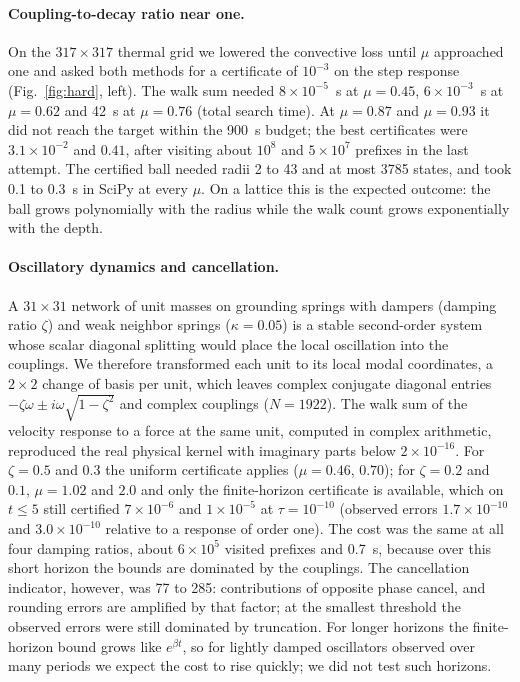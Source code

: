 \documentclass[aps,pra,superscriptaddress,floatfix,longbibliography,twocolumn]{revtex4-2}
\begin{document}
\paragraph*{Coupling-to-decay ratio near one.} On the $317\times317$ thermal grid we lowered the convective loss until $\mu$ approached one and asked both methods for a certificate of $10^{-3}$ on the step response (Fig.~\ref{fig:hard}, left). The walk sum needed $8\times10^{-5}$~s at $\mu=0.45$, $6\times10^{-3}$~s at $\mu=0.62$ and 42~s at $\mu=0.76$ (total search time). At $\mu=0.87$ and $\mu=0.93$ it did not reach the target within the 900~s budget; the best certificates were $3.1\times10^{-2}$ and $0.41$, after visiting about $10^8$ and $5\times10^7$ prefixes in the last attempt. The certified ball needed radii 2 to 43 and at most 3785 states, and took 0.1 to 0.3~s in SciPy at every $\mu$. On a lattice this is the expected outcome: the ball grows polynomially with the radius while the walk count grows exponentially with the depth.

\paragraph*{Oscillatory dynamics and cancellation.} A $31\times31$ network of unit masses on grounding springs with dampers (damping ratio $\zeta$) and weak neighbor springs ($\kappa=0.05$) is a stable second-order system whose scalar diagonal splitting would place the local oscillation into the couplings. We therefore transformed each unit to its local modal coordinates, a $2\times2$ change of basis per unit, which leaves complex conjugate diagonal entries $-\zeta\omega\pm i\omega\sqrt{1-\zeta^2}$ and complex couplings ($N=1922$). The walk sum of the velocity response to a force at the same unit, computed in complex arithmetic, reproduced the real physical kernel with imaginary parts below $2\times10^{-16}$. For $\zeta=0.5$ and $0.3$ the uniform certificate applies ($\mu=0.46$, $0.70$); for $\zeta=0.2$ and $0.1$, $\mu=1.02$ and $2.0$ and only the finite-horizon certificate is available, which on $t\le5$ still certified $7\times10^{-6}$ and $1\times10^{-5}$ at $\tau=10^{-10}$ (observed errors $1.7\times10^{-10}$ and $3.0\times10^{-10}$ relative to a response of order one). The cost was the same at all four damping ratios, about $6\times10^5$ visited prefixes and 0.7~s, because over this short horizon the bounds are dominated by the couplings. The cancellation indicator, however, was 77 to 285: contributions of opposite phase cancel, and rounding errors are amplified by that factor; at the smallest threshold the observed errors were still dominated by truncation. For longer horizons the finite-horizon bound grows like $e^{\beta t}$, so for lightly damped oscillators observed over many periods we expect the cost to rise quickly; we did not test such horizons.
\end{document}

